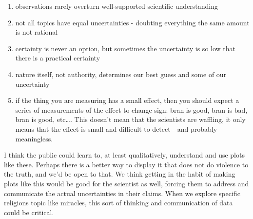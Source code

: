 \begin{enumerate}
\def\labelenumi{\arabic{enumi}.}
\itemsep1pt\parskip0pt
\item
  observations rarely overturn well-supported scientific understanding
\item
  not all topics have equal uncertainties - doubting everything the same
  amount is not rational
\item
  certainty is never an option, but sometimes the uncertainty is so low
  that there is a practical certainty
\item
  nature itself, not authority, determines our best guess and some of
  our uncertainty
\item
  if the thing you are measuring has a small effect, then you should
  expect a series of measurements of the effect to change sign: bran is
  good, bran is bad, bran is good, etc\ldots{}. This doesn't mean that
  the scientists are waffling, it only means that the effect is small
  and difficult to detect - and probably meaningless.
\end{enumerate}

I think the public could learn to, at least qualitatively, understand
and use plots like these. Perhaps there is a better way to display it
that does not do violence to the truth, and we'd be open to that.  We think getting in the habit of making plots like this would be good for the
scientist as well, forcing them to address and communicate the actual
uncertainties in their claims.  When we explore specific religions topic like miracles, this sort of thinking and communication of data could be critical.
